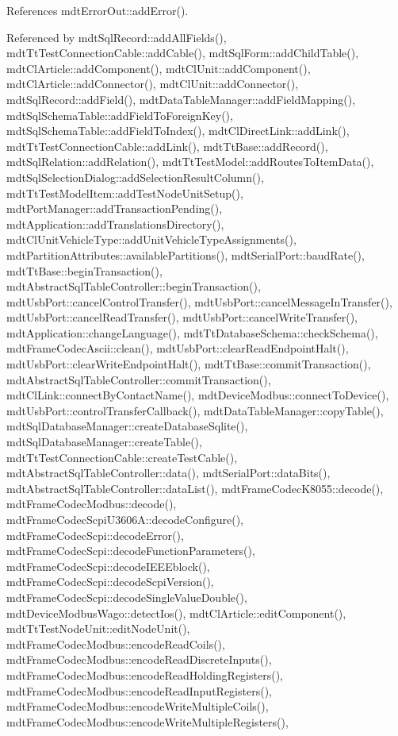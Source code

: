 References mdt\-Error\-Out\-::add\-Error().



Referenced by mdt\-Sql\-Record\-::add\-All\-Fields(), mdt\-Tt\-Test\-Connection\-Cable\-::add\-Cable(), mdt\-Sql\-Form\-::add\-Child\-Table(), mdt\-Cl\-Article\-::add\-Component(), mdt\-Cl\-Unit\-::add\-Component(), mdt\-Cl\-Article\-::add\-Connector(), mdt\-Cl\-Unit\-::add\-Connector(), mdt\-Sql\-Record\-::add\-Field(), mdt\-Data\-Table\-Manager\-::add\-Field\-Mapping(), mdt\-Sql\-Schema\-Table\-::add\-Field\-To\-Foreign\-Key(), mdt\-Sql\-Schema\-Table\-::add\-Field\-To\-Index(), mdt\-Cl\-Direct\-Link\-::add\-Link(), mdt\-Tt\-Test\-Connection\-Cable\-::add\-Link(), mdt\-Tt\-Base\-::add\-Record(), mdt\-Sql\-Relation\-::add\-Relation(), mdt\-Tt\-Test\-Model\-::add\-Routes\-To\-Item\-Data(), mdt\-Sql\-Selection\-Dialog\-::add\-Selection\-Result\-Column(), mdt\-Tt\-Test\-Model\-Item\-::add\-Test\-Node\-Unit\-Setup(), mdt\-Port\-Manager\-::add\-Transaction\-Pending(), mdt\-Application\-::add\-Translations\-Directory(), mdt\-Cl\-Unit\-Vehicle\-Type\-::add\-Unit\-Vehicle\-Type\-Assignments(), mdt\-Partition\-Attributes\-::available\-Partitions(), mdt\-Serial\-Port\-::baud\-Rate(), mdt\-Tt\-Base\-::begin\-Transaction(), mdt\-Abstract\-Sql\-Table\-Controller\-::begin\-Transaction(), mdt\-Usb\-Port\-::cancel\-Control\-Transfer(), mdt\-Usb\-Port\-::cancel\-Message\-In\-Transfer(), mdt\-Usb\-Port\-::cancel\-Read\-Transfer(), mdt\-Usb\-Port\-::cancel\-Write\-Transfer(), mdt\-Application\-::change\-Language(), mdt\-Tt\-Database\-Schema\-::check\-Schema(), mdt\-Frame\-Codec\-Ascii\-::clean(), mdt\-Usb\-Port\-::clear\-Read\-Endpoint\-Halt(), mdt\-Usb\-Port\-::clear\-Write\-Endpoint\-Halt(), mdt\-Tt\-Base\-::commit\-Transaction(), mdt\-Abstract\-Sql\-Table\-Controller\-::commit\-Transaction(), mdt\-Cl\-Link\-::connect\-By\-Contact\-Name(), mdt\-Device\-Modbus\-::connect\-To\-Device(), mdt\-Usb\-Port\-::control\-Transfer\-Callback(), mdt\-Data\-Table\-Manager\-::copy\-Table(), mdt\-Sql\-Database\-Manager\-::create\-Database\-Sqlite(), mdt\-Sql\-Database\-Manager\-::create\-Table(), mdt\-Tt\-Test\-Connection\-Cable\-::create\-Test\-Cable(), mdt\-Abstract\-Sql\-Table\-Controller\-::data(), mdt\-Serial\-Port\-::data\-Bits(), mdt\-Abstract\-Sql\-Table\-Controller\-::data\-List(), mdt\-Frame\-Codec\-K8055\-::decode(), mdt\-Frame\-Codec\-Modbus\-::decode(), mdt\-Frame\-Codec\-Scpi\-U3606\-A\-::decode\-Configure(), mdt\-Frame\-Codec\-Scpi\-::decode\-Error(), mdt\-Frame\-Codec\-Scpi\-::decode\-Function\-Parameters(), mdt\-Frame\-Codec\-Scpi\-::decode\-I\-E\-E\-Eblock(), mdt\-Frame\-Codec\-Scpi\-::decode\-Scpi\-Version(), mdt\-Frame\-Codec\-Scpi\-::decode\-Single\-Value\-Double(), mdt\-Device\-Modbus\-Wago\-::detect\-Ios(), mdt\-Cl\-Article\-::edit\-Component(), mdt\-Tt\-Test\-Node\-Unit\-::edit\-Node\-Unit(), mdt\-Frame\-Codec\-Modbus\-::encode\-Read\-Coils(), mdt\-Frame\-Codec\-Modbus\-::encode\-Read\-Discrete\-Inputs(), mdt\-Frame\-Codec\-Modbus\-::encode\-Read\-Holding\-Registers(), mdt\-Frame\-Codec\-Modbus\-::encode\-Read\-Input\-Registers(), mdt\-Frame\-Codec\-Modbus\-::encode\-Write\-Multiple\-Coils(), mdt\-Frame\-Codec\-Modbus\-::encode\-Write\-Multiple\-Registers(), 
